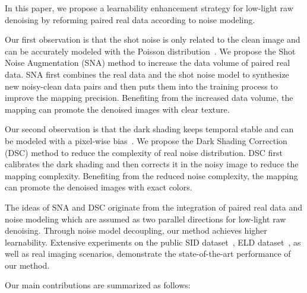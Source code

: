 \documentclass[sigconf,screen,nonacm]{acmart}
\begin{document}
In this paper, we propose a learnability enhancement strategy for low-light raw denoising by reforming paired real data according to noise modeling.

Our first observation is that the shot noise is only related to the clean image and can be accurately modeled with the Poisson distribution~\cite{SPIE85/CCD,TPAMI94/CCD}.
We propose the Shot Noise Augmentation (SNA) method to increase the data volume of paired real data.
SNA first combines the real data and the shot noise model to synthesize new noisy-clean data pairs and then puts them into the training process to improve the mapping precision.
Benefiting from the increased data volume, the mapping can promote the denoised images with clear texture.


Our second observation is that the dark shading keeps temporal stable and can be modeled with a pixel-wise bias~\cite{TIP14/FPNR,darkshading}.
We propose the Dark Shading Correction (DSC) method to reduce the complexity of real noise distribution. 
DSC first calibrates the dark shading and then corrects it in the noisy image to reduce the mapping complexity.
Benefiting from the reduced noise complexity, the mapping can promote the denoised images with exact colors.



The ideas of SNA and DSC originate from the integration of paired real data and noise modeling which are assumed as two parallel directions for low-light raw denoising.
Through noise model decoupling, our method achieves higher learnability.
Extensive experiments on the public SID dataset~\cite{CVPR18/SID}, ELD dataset~\cite{TPAMI21/ELD}, as well as real imaging scenarios, demonstrate the state-of-the-art performance of our method.

Our main contributions are summarized as follows:
\end{document}
